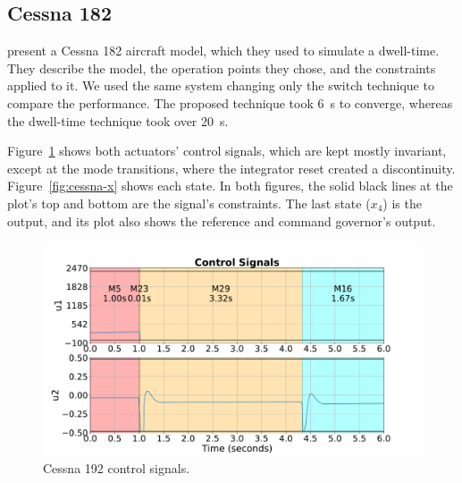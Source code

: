 \FloatBarrier

\subsection{Cessna 182}%
\label{subsec:cessna}

\textcite{franzè.lucia.ea:command} present a Cessna 182 aircraft model, which
they used to simulate a dwell-time. They describe the model, the operation
points they chose, and the constraints applied to it. We used the same system
changing only the switch technique to compare the performance. The proposed
technique took \SI{6}{\second} to converge, whereas the dwell-time technique
took over \SI{20}{\second}.

Figure~\ref{fig:cessna-u} shows both actuators' control signals, which are kept
mostly invariant, except at the mode transitions, where the integrator reset
created a discontinuity. Figure~\ref{fig:cessna-x} shows each state. In both
figures, the solid black lines at the plot's top and bottom are the signal's
constraints. The last state (\(x_{4}\)) is the output, and its plot also shows
the reference and command governor's output.

\begin{figure}[ht!]
  \centering
  \includegraphics[height=0.3\textheight]{imgs/cessna-u}
  \caption{Cessna 192 control signals.}%
  \label{fig:cessna-u}
\end{figure}

